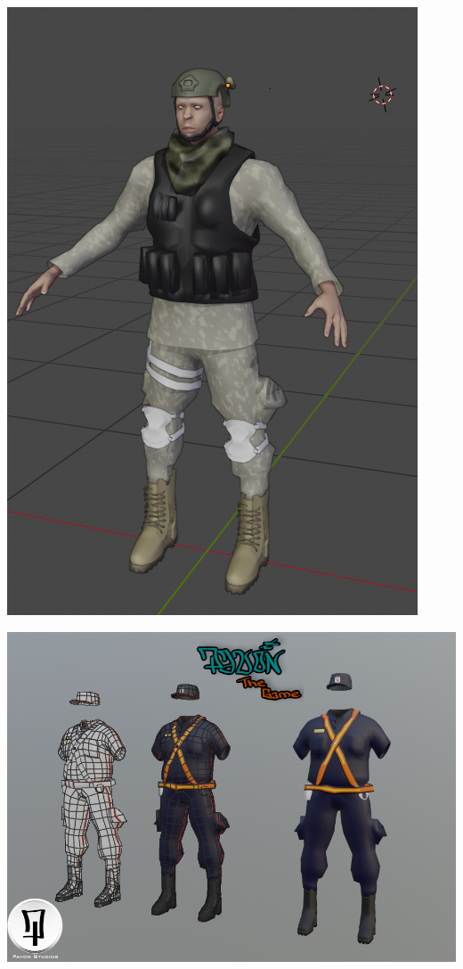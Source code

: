 \documentclass{article}
\begin{document}
  \includegraphics[width=\textwidth]{74.png}

  \includegraphics[width=\textwidth]{75.png}
\end{document}
